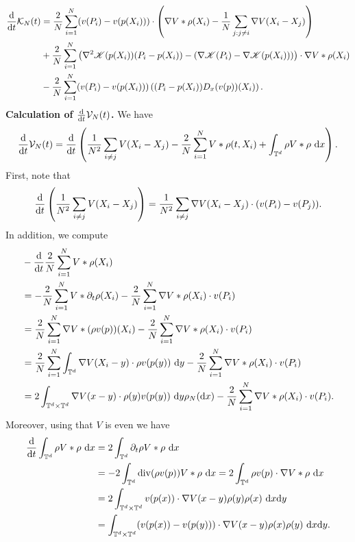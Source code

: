 \documentclass[11pt,reqno]{amsart}
\numberwithin{equation}{section}
\def\dd{{\rm d}}
\begin{document}
\begin{align}
\frac{\dd}{\dd t}\mathcal{K}_{N}(t)&= \frac{2}{N}\sum_{i=1}^{N}(v(P_{i})-v(p(X_{i})))\cdot \left(\nabla V\ast \rho(X_{i})-\frac{1}{N}\sum_{j:j\neq i}\nabla V(X_{i}-X_{j})\right)   
 \notag\\
&+\frac{2}{N}\sum_{i=1}^{N}\left(\nabla^{2} \mathscr{K}(p(X_{i}))(P_{i}-p(X_{i}))-(\nabla \mathscr{K}(P_{i})-\nabla \mathscr{K}(p(X_{i})))\right)\cdot \nabla V\ast \rho(X_{i}) \notag\\
&-\frac{2}{N}\sum_{i=1}^{N}(v(P_{i})-v(p(X_{i})))\left((P_{i}-p(X_{i}))D_{x}(v(p))(X_{i})\right). \label{time der of KN} 
\end{align}
\textbf{Calculation of $\frac{\dd}{\dd t}\mathcal{V}_{N}(t)$.} We have 
\begin{align*}
\frac{\dd}{\dd t}\mathcal{V}_{N}(t)=\frac{\dd}{\dd t}\left(\frac{1}{N^{2}}\sum_{i\neq j}V(X_{i}-X_{j})-\frac{2}{N}\sum_{i=1}^{N}V\ast \rho(t,X_{i})+\int_{\mathbb{T}^{d}}\rho V\ast\rho \ \dd x \right).    
\end{align*}
First, note that 
\begin{align}
\frac{\dd}{\dd t}\left(\frac{1}{N^{2}}\sum_{i\neq j}V(X_{i}-X_{j})\right)=\frac{1}{N^{2}}\sum_{i\neq j}\nabla V(X_{i}-X_{j})\cdot(v(P_{i})-v(P_{j})). \label{time der of pure product of empirical}     
\end{align}
In addition, we compute \begin{align}
&-\frac{\dd}{\dd t}\frac{2}{N}\sum_{i=1}^{N}V\ast \rho(X_{i}) \notag\\
&=-\frac{2}{N}\sum_{i=1}^{N} V\ast \partial_{t}\rho(X_{i})-\frac{2}{N}\sum_{i=1}^{N} \nabla V\ast \rho(X_{i})\cdot v(P_{i}) \notag\\
&=\frac{2}{N}\sum_{i=1}^{N}\nabla V\ast (\rho v(p))(X_{i})-\frac{2}{N}\sum_{i=1}^{N}\nabla V\ast \rho(X_{i})\cdot v(P_{i}) \notag\\
&=\frac{2}{N}\sum_{i=1}^{N}\int_{\mathbb{T}^{d}}\nabla V(X_{i}-y)\cdot \rho v(p(y))\ \dd y-  \frac{2}{N}\sum_{i=1}^{N}\nabla V\ast \rho(X_{i})\cdot v(P_{i}) \notag\\
&=2\int_{\mathbb{T}^{d}\times \mathbb{T}^{d}}\nabla V(x-y)\cdot \rho(y)v(p(y))\ \dd y \rho_{N}(\dd x)-  \frac{2}{N}\sum_{i=1}^{N}\nabla V\ast \rho(X_{i})\cdot v(P_{i}). \label{time der of mixed products}
\end{align}
Moreover, using that $V$ is even we have 
\begin{align}
\frac{\dd}{\dd t}\int_{\mathbb{T}^{d}}\rho V\ast \rho\ \dd x&=2\int_{\mathbb{T}^{d}}\partial_{t}\rho V\ast \rho \ \dd x \notag\\
&=-2\int_{\mathbb{T}^{d}}\mathrm{div}(\rho v(p))V\ast \rho \ \dd x=2\int_{\mathbb{T}^{d}} \rho v(p)\cdot \nabla V\ast \rho \ \dd x \notag\\
&=2\int_{\mathbb{T}^{d}\times \mathbb{T}^{d}} v(p(x))\cdot \nabla V(x-y)\rho(y)\rho(x)\ \dd x\dd y \notag\\
&=\int_{\mathbb{T}^{d}\times \mathbb{T}^{d}}(v(p(x))-v(p(y)))\cdot \nabla V(x-y)\rho(x)\rho(y)\ \dd x\dd y.   \label{time der of pure product of limit}
\end{align}
\end{document}
